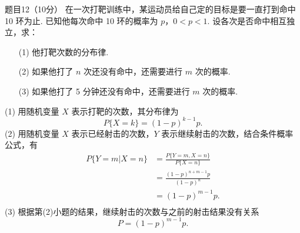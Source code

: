 \documentclass{article}
\begin{document}
\begin{question}{题目12（10分）}
    在一次打靶训练中，某运动员给自己定的目标是要一直打到命中 10 环为止. 已知他每次命中 10 环的概率为 $p$，$0<p<1$. 设各次是否命中相互独立，求：
    \begin{itemize}
        \item [(1)] 他打靶次数的分布律.
        \item [(2)] 如果他打了 $n$ 次还没有命中，还需要进行 $m$ 次的概率.
        \item [(3)] 如果他打了 5 分钟还没有命中，还需要进行 $m$ 次的概率.
    \end{itemize}
\end{question}
\begin{solution}
    (1) 用随机变量 $X$ 表示打靶的次数，其分布律为
    $$
        P\{X=k\} = (1-p)^{k-1}p.
    $$
    (2) 用随机变量 $X$ 表示已经射击的次数，$Y$ 表示继续射击的次数，结合条件概率公式，有
    $$
        \begin{aligned}
            P\{Y=m|X=n\}
             & = \frac{P\{Y=m, X=n\}}{P\{X=n\}} \\
             & = \frac{(1-p)^{n+m-1}p}{(1-p)^n} \\
             & = (1-p)^{m-1}p.                  \\
        \end{aligned}
    $$
    (3) 根据第(2)小题的结果，继续射击的次数与之前的射击结果没有关系
    $$
        P = (1-p)^{m-1}p.
    $$
\end{solution}
\end{document}
